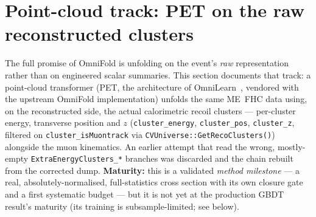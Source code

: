 \section{Point-cloud track: PET on the raw reconstructed clusters}
\label{sec:pet}

The full promise of OmniFold is unfolding on the event's \emph{raw}
representation rather than on engineered scalar summaries. This section
documents that track: a point-cloud transformer (PET, the architecture of
OmniLearn~\cite{Mikuni:2024qsr}, vendored with the upstream OmniFold
implementation) unfolds the same ME~FHC data using, on the reconstructed
side, the actual calorimetric recoil clusters --- per-cluster energy,
transverse position and $z$ (\texttt{cluster\_energy}, \texttt{cluster\_pos},
\texttt{cluster\_z}, filtered on \texttt{cluster\_isMuontrack} via
\texttt{CVUniverse::GetRecoClusters()}) alongside the muon kinematics. An
earlier attempt that read the wrong, mostly-empty
\texttt{ExtraEnergyClusters\_*} branches was discarded and the chain rebuilt
from the corrected dump. \textbf{Maturity:} this is a validated \emph{method
milestone} --- a real, absolutely-normalised, full-statistics cross section
with its own closure gate and a first systematic budget --- but it is not yet
at the production GBDT result's maturity (its training is
subsample-limited; see below).

